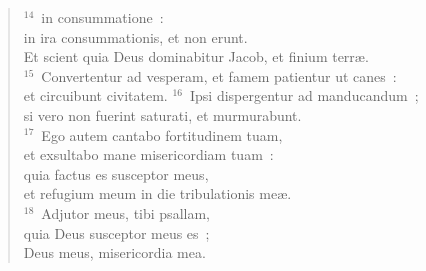\begin{flushleft}
\begin{verse}
${}^{14}$~in consummatione~:\\ in ira consummationis, et non erunt.\\ Et scient quia Deus dominabitur Jacob, et finium terr\ae .\\
${}^{15}$~Convertentur ad vesperam, et famem patientur ut canes~:\\ et circuibunt civitatem.
${}^{16}$~Ipsi dispergentur ad manducandum~;\\ si vero non fuerint saturati, et murmurabunt.\\
${}^{17}$~Ego autem cantabo fortitudinem tuam,\\ et exsultabo mane misericordiam tuam~:\\ quia factus es susceptor meus,\\ et refugium meum in die tribulationis me\ae .\\
${}^{18}$~Adjutor meus, tibi psallam,\\ quia Deus susceptor meus es~;\\ Deus meus, misericordia mea.\end{verse}\end{flushleft}



